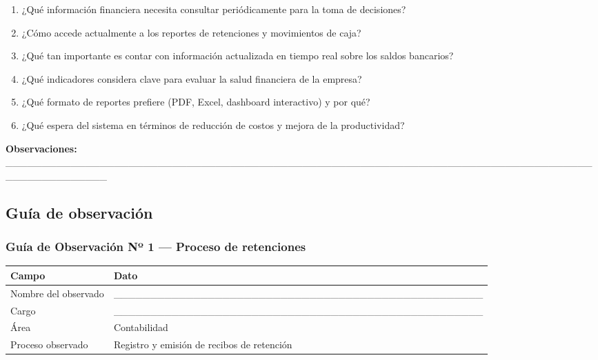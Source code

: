 \documentclass[stu]{apa7}
\begin{document}
\begin{enumerate}
    \item ¿Qué información financiera necesita consultar periódicamente para la toma de decisiones?

    \item ¿Cómo accede actualmente a los reportes de retenciones y movimientos de caja?

    \item ¿Qué tan importante es contar con información actualizada en tiempo real sobre los saldos bancarios?

    \item ¿Qué indicadores considera clave para evaluar la salud financiera de la empresa?

    \item ¿Qué formato de reportes prefiere (PDF, Excel, dashboard interactivo) y por qué?

    \item ¿Qué espera del sistema en términos de reducción de costos y mejora de la productividad?
\end{enumerate}

\vspace{0.3cm}

\textbf{Observaciones:} \_\_\_\_\_\_\_\_\_\_\_\_\_\_\_\_\_\_\_\_\_\_\_\_\_\_\_\_\_\_\_\_\_\_\_\_\_\_\_\_\_\_\_\_\_\_\_\_\_\_\_\_\_\_\_\_\_\_\_\_\_\_\_\_\_\_\_\_\_\_\_\_\_\_\_\_\_\_\_\_\_\_\_\_\_\_\_\_\_\_\_\_\_\_\_

\newpage

\subsection{Guía de observación}

\subsubsection{Guía de Observación Nº 1 --- Proceso de retenciones}

\begin{tabularx}{\textwidth}{|l|X|}
\hline
\rowcolor[gray]{0.9}
\textbf{Campo} & \textbf{Dato} \\
\hline
Nombre del observado & \_\_\_\_\_\_\_\_\_\_\_\_\_\_\_\_\_\_\_\_\_\_\_\_\_\_\_\_\_\_\_\_\_\_\_\_\_\_\_\_\_\_\_\_\_\_\_\_\_\_\_ \\
\hline
Cargo & \_\_\_\_\_\_\_\_\_\_\_\_\_\_\_\_\_\_\_\_\_\_\_\_\_\_\_\_\_\_\_\_\_\_\_\_\_\_\_\_\_\_\_\_\_\_\_\_\_\_\_ \\
\hline
Área & Contabilidad \\
\hline
Proceso observado & Registro y emisión de recibos de retención \\
\hline
\end{tabularx}
\end{document}

